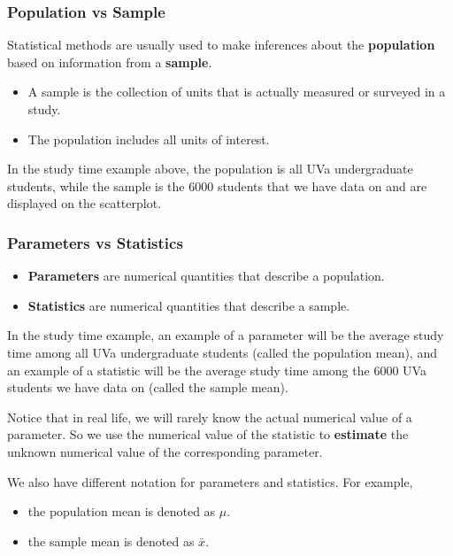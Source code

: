 \documentclass[
]{book}
\providecommand{\tightlist}{%
  \setlength{\itemsep}{0pt}\setlength{\parskip}{0pt}}
\begin{document}
\hypertarget{population-vs-sample}{%
\subsubsection{Population vs Sample}\label{population-vs-sample}}

Statistical methods are usually used to make inferences about the \textbf{population} based on information from a \textbf{sample}.

\begin{itemize}
\tightlist
\item
  A sample is the collection of units that is actually measured or surveyed in a study.
\item
  The population includes all units of interest.
\end{itemize}

In the study time example above, the population is all UVa undergraduate students, while the sample is the 6000 students that we have data on and are displayed on the scatterplot.

\hypertarget{parameters-vs-statistics}{%
\subsubsection{Parameters vs Statistics}\label{parameters-vs-statistics}}

\begin{itemize}
\tightlist
\item
  \textbf{Parameters} are numerical quantities that describe a population.
\item
  \textbf{Statistics} are numerical quantities that describe a sample.
\end{itemize}

In the study time example, an example of a parameter will be the average study time among all UVa undergraduate students (called the population mean), and an example of a statistic will be the average study time among the 6000 UVa students we have data on (called the sample mean).

Notice that in real life, we will rarely know the actual numerical value of a parameter. So we use the numerical value of the statistic to \textbf{estimate} the unknown numerical value of the corresponding parameter.

We also have different notation for parameters and statistics. For example,

\begin{itemize}
\tightlist
\item
  the population mean is denoted as \(\mu\).
\item
  the sample mean is denoted as \(\bar{x}\).
\end{itemize}
\end{document}
